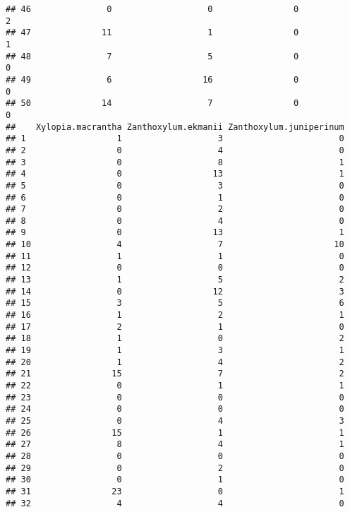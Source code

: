 \documentclass[
]{article}
\begin{document}
\begin{verbatim}
## 46               0                   0                0                   2
## 47              11                   1                0                   1
## 48               7                   5                0                   0
## 49               6                  16                0                   0
## 50              14                   7                0                   0
##    Xylopia.macrantha Zanthoxylum.ekmanii Zanthoxylum.juniperinum
## 1                  1                   3                       0
## 2                  0                   4                       0
## 3                  0                   8                       1
## 4                  0                  13                       1
## 5                  0                   3                       0
## 6                  0                   1                       0
## 7                  0                   2                       0
## 8                  0                   4                       0
## 9                  0                  13                       1
## 10                 4                   7                      10
## 11                 1                   1                       0
## 12                 0                   0                       0
## 13                 1                   5                       2
## 14                 0                  12                       3
## 15                 3                   5                       6
## 16                 1                   2                       1
## 17                 2                   1                       0
## 18                 1                   0                       2
## 19                 1                   3                       1
## 20                 1                   4                       2
## 21                15                   7                       2
## 22                 0                   1                       1
## 23                 0                   0                       0
## 24                 0                   0                       0
## 25                 0                   4                       3
## 26                15                   1                       1
## 27                 8                   4                       1
## 28                 0                   0                       0
## 29                 0                   2                       0
## 30                 0                   1                       0
## 31                23                   0                       1
## 32                 4                   4                       0

\end{verbatim}
\end{document}
